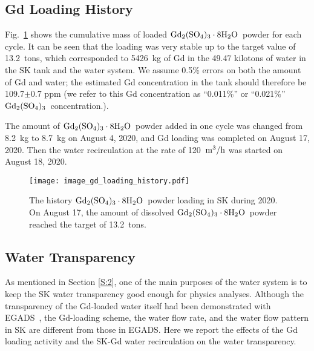 \documentclass[preprint,12pt]{elsarticle}
\newcommand{\GdSOw}{$\rm Gd_2(\rm SO_4)_3\cdot \rm 8H_2O$\ }
\newcommand{\GdSO}{$\rm Gd_2(\rm SO_4)_3$\ }
\begin{document}
\subsection{Gd Loading History}
\label{S:4-3}
Fig.~\ref{fig:gd_loading_history} shows the cumulative mass of loaded \GdSOw powder for each cycle.
It can be seen that the loading was very stable up to the target value of 13.2~tons, which corresponded to 5426~kg of Gd in the 49.47 kilotons of water in the SK tank and the water system. We assume 0.5\% errors on both the amount of Gd and water; the estimated Gd concentration in the tank should therefore be 109.7$\pm$0.7 ppm (we refer to this Gd concentration as ``0.011\%'' or ``0.021\%'' \GdSO concentration.).

The amount of \GdSOw powder added in one cycle was changed from 8.2~kg to 8.7~kg on August 4, 2020, and 
Gd loading was completed on August 17, 2020.
Then the water recirculation at the rate of 120~$\rm m^3/h$ was started on August 18, 2020.


\begin{figure}[htb]
\centering\texttt{[image: image\_gd\_loading\_history.pdf]}
\caption{The history \GdSOw powder loading in SK during 2020. On August 17, the amount of dissolved \GdSOw powder reached the target of 13.2~tons.}
\label{fig:gd_loading_history}
\end{figure}

\subsection{Water Transparency} 
As mentioned in Section \ref{S:2}, one of the main purposes of the water system is to keep the SK water transparency good enough for physics analyses. Although the transparency of the Gd-loaded water itself had been demonstrated with EGADS~\cite{egads:2020}, the Gd-loading scheme, the water flow rate, and the water flow pattern in SK are different from those in EGADS. Here we report the effects of the Gd loading activity and the SK-Gd water recirculation on the water transparency. 
\end{document}
